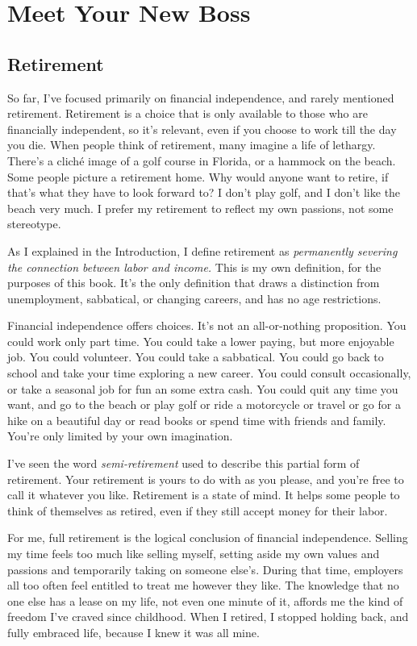 \chapter{Meet Your New Boss}

\section{Retirement}
So far, I've focused primarily on financial independence, and rarely mentioned retirement. Retirement is a choice that is only available to those who are financially independent, so it's relevant, even if you choose to work till the day you die. When people think of retirement, many imagine a life of lethargy. There's a clich\'e image of a golf course in Florida, or a hammock on the beach. Some people picture a retirement home. Why would anyone want to retire, if that's what they have to look forward to? I don't play golf, and I don't like the beach very much. I prefer my retirement to reflect my own passions, not some stereotype.

As I explained in the Introduction, I define retirement as \emph{permanently severing the connection between labor and income.} This is my own definition, for the purposes of this book. It's the only definition that draws a distinction from unemployment, sabbatical, or changing careers, and has no age restrictions.

Financial independence offers choices. It's not an all-or-nothing proposition. You could work only part time. You could take a lower paying, but more enjoyable job. You could volunteer. You could take a sabbatical. You could go back to school and take your time exploring a new career. You could consult occasionally, or take a seasonal job for fun an some extra cash. You could quit any time you want, and go to the beach or play golf or ride a motorcycle or travel or go for a hike on a beautiful day or read books or spend time with friends and family. You're only limited by your own imagination.

I've seen the word \emph{semi-retirement} used to describe this partial form of retirement. Your retirement is yours to do with as you please, and you're free to call it whatever you like. Retirement is a state of mind. It helps some people to think of themselves as retired, even if they still accept money for their labor. 

For me, full retirement is the logical conclusion of financial independence. Selling my time feels too much like selling myself, setting aside my own values and passions and temporarily taking on someone else's. During that time, employers all too often feel entitled to treat me however they like. The knowledge that no one else has a lease on my life, not even one minute of it, affords me the kind of freedom I've craved since childhood. When I retired, I stopped holding back, and fully embraced life, because I knew it was all mine.

